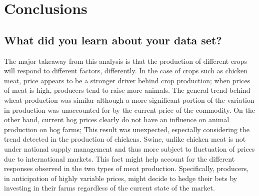 \section{Conclusions}

\subsection{What did you learn about your data set?}

The major takeaway from this analysis is that the production of different crops will respond to different factors, differently.
In the case of crops such as chicken meat, price appears to be a stronger driver behind crop production; when prices of meat is high, producers tend to raise more animals.
The general trend behind wheat production was similar although a more significant portion of the variation in production was unaccounted for by the current price of the commodity.
On the other hand, current hog prices clearly do not have an influence on animal production on hog farms;
This result was unexpected, especially considering the trend detected in the production of chickens.
Swine, unlike chicken meat is not under national supply management and thus more subject to fluctuation of prices due to international markets.
This fact might help account for the different responses observed in the two types of meat production.
Specifically, producers, in anticipation of highly variable prices, might decide to hedge their bets by investing in their farms regardless of the current state of the market.


